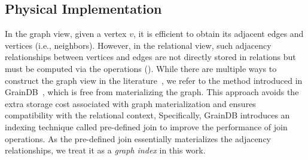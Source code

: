 

\subsection{Physical Implementation}
\label{sec:physical-operators}

In the graph view, given a vertex $v$, it is efficient to obtain its adjacent edges and vertices (i.e., neighbors). However, in the relational view, such adjacency relationships between vertices and edges are not directly stored in relations but must be computed via the \EVjoin operations (). While there are multiple ways to construct the graph view in the literature~\cite{gart,GRFusion}, we refer to the method introduced in GrainDB~\cite{graindb}, which is free from materializing the graph. This approach avoids the extra storage cost associated with graph materialization and ensures compatibility with the relational context,
Specifically, GrainDB introduces an indexing technique called pre-defined join to improve the performance of join operations. As the pre-defined join essentially materializes the adjacency relationships, we treat it as a \emph{graph index} in this work.

